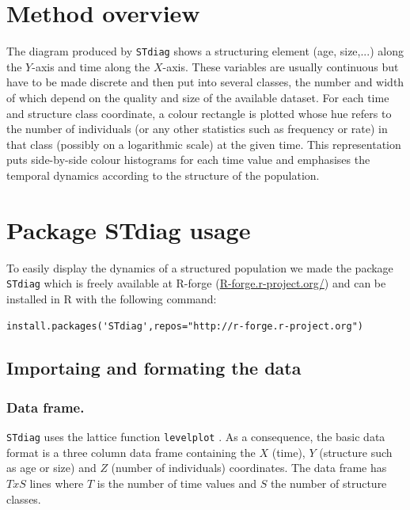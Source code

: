 \section{Method overview}

The diagram produced by \texttt{STdiag} shows a structuring element (age, size,...) along
the $Y$-axis and time along the $X$-axis. These variables are usually continuous
but have to be made discrete and then put into several classes, the number and width
of which depend on the quality and size of the available dataset. For each time
and structure class coordinate, a colour rectangle is plotted whose hue refers
to the number of individuals (or any other statistics such as frequency or rate)
in that class (possibly on a logarithmic scale) at the given time. This
representation puts side-by-side colour histograms for each time value and
emphasises the temporal dynamics according to the structure of the population.

\section{Package STdiag usage}

To easily display the dynamics of a structured population we made the package
\texttt{STdiag} which is freely available at R-forge (\url{R-forge.r-project.org/}) and
can be installed in R with the following command:

\begin{verbatim}
install.packages('STdiag',repos="http://r-forge.r-project.org")
\end{verbatim}

\subsection{Importaing and formating the data}

\subsubsection{Data frame.}
\texttt{STdiag} uses the lattice function \texttt{levelplot}
\autocite{sarkar2008a}.
As a consequence, the basic data format is a three column data frame containing the
$X$ (time), $Y$ (structure such as age or size) and $Z$ (number of individuals)
coordinates. The data frame has $TxS$ lines where $T$ is the number of time
values and $S$ the number of structure classes.

